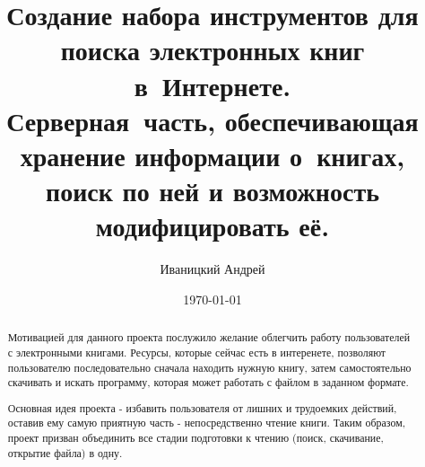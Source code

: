 \documentclass[a4paper,12pt]{article}
\begin{document}
\title{Создание набора инструментов для поиска электронных книг в~Интернете.\\
Серверная~часть, 
обеспечивающая хранение информации о~книгах, поиск по ней и возможность модифицировать её.}
\author{Иваницкий Андрей}
\date{\today}
\maketitle

\newpage


\begin{abstract}

Мотивацией для данного проекта послужило желание облегчить работу пользователей с электронными книгами. Ресурсы, которые сейчас есть в интеренете, позволяют пользователю последовательно сначала находить нужную книгу, затем самостоятельно скачивать и искать программу, которая может работать с файлом в заданном формате.

Основная идея проекта - избавить пользователя от лишних и трудоемких действий, оставив ему самую приятную часть - непосредственно чтение книги. Таким образом, проект призван объединить все стадии подготовки к чтению (поиск, скачивание, открытие файла) в одну.
\end{abstract}

\newpage
\tableofcontents
\newpage


%

%

%

%

%

\end{document}
